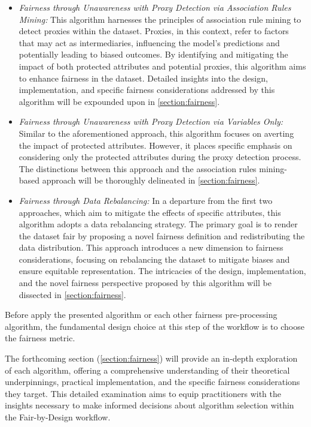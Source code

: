 \begin{itemize}

    \item \emph{Fairness through Unawareness with Proxy Detection via Association Rules Mining:} This algorithm harnesses the principles of association rule mining to detect proxies within the dataset. Proxies, in this context, refer to factors that may act as intermediaries, influencing the model's predictions and potentially leading to biased outcomes. By identifying and mitigating the impact of both protected attributes and potential proxies, this algorithm aims to enhance fairness in the dataset. Detailed insights into the design, implementation, and specific fairness considerations addressed by this algorithm will be expounded upon in \cref{section:fairness}.
    
    \item \emph{Fairness through Unawareness with Proxy Detection via Variables Only:} Similar to the aforementioned approach, this algorithm focuses on averting the impact of protected attributes. However, it places specific emphasis on considering only the protected attributes during the proxy detection process. The distinctions between this approach and the association rules mining-based approach will be thoroughly delineated in \cref{section:fairness}.
    
    \item \emph{Fairness through Data Rebalancing:} In a departure from the first two approaches, which aim to mitigate the effects of specific attributes, this algorithm adopts a data rebalancing strategy. The primary goal is to render the dataset fair by proposing a novel fairness definition and redistributing the data distribution. This approach introduces a new dimension to fairness considerations, focusing on rebalancing the dataset to mitigate biases and ensure equitable representation. The intricacies of the design, implementation, and the novel fairness perspective proposed by this algorithm will be dissected in \cref{section:fairness}.

\end{itemize}

Before apply the presented algorithm or each other fairness pre-processing algorithm, the fundamental design choice at this step of the workflow is to choose the fairness metric.

The forthcoming section (\cref{section:fairness}) will provide an in-depth exploration of each algorithm, offering a comprehensive understanding of their theoretical underpinnings, practical implementation, and the specific fairness considerations they target. This detailed examination aims to equip practitioners with the insights necessary to make informed decisions about algorithm selection within the Fair-by-Design workflow.

